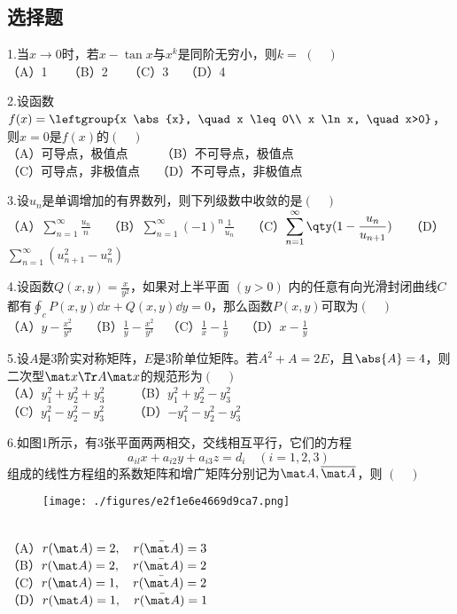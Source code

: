 
\subsection{选择题}
1.当$x \to 0$时，若$x-\tan x$与$x^k$是同阶无穷小，则$k=$ $(\quad)$\\
（A）1 $\quad$ （B）2 $\quad$ （C）3  $\quad$（D）4 $\quad$

2.设函数$f(x)=\leftgroup{x \abs{x}, \quad x \leq 0\\ x \ln x, \quad x>0}$，则$x=0$是$f(x)$的$(\quad)$\\
（A）可导点，极值点 $ \qquad$ （B）不可导点，极值点 \\
（C）可导点，非极值点  $\quad$（D）不可导点，非极值点 

3.设${u_n}$是单调增加的有界数列，则下列级数中收敛的是$(\quad)$\\
（A）$\displaystyle \sum_{n=1}^\infty \frac{u_n}{n} \quad$ 
（B）$\displaystyle \sum_{n=1}^\infty (-1)^n \frac{1}{u_n} \quad$
（C）$\displaystyle \sum_{n=1}^\infty \qty (1- \frac{u_n}{u_{n+1}}) \quad$ 
（D）$\displaystyle \sum_{n=1}^\infty (u_{n+1}^2-u_n ^2)$

4.设函数$Q(x,y)=\frac{x}{y^2}$，如果对上半平面 $(y>0)$ 内的任意有向光滑封闭曲线$C$都有$\oint_c P(x,y)\dd{x}+Q(x,y)\dd{y}=0$，那么函数$P(x,y)$可取为$(\quad)$\\
（A）$ \displaystyle y-\frac{x^2}{y^3} \quad$ （B）$\displaystyle \frac{1}{y}-\frac{x^2}{y^3}\quad$（C）$ \displaystyle \frac{1}{x}-\frac{1}{y}\quad$ （D）$ \displaystyle x-\frac{1}{y}\quad$

5.设$A$是3阶实对称矩阵，$E$是3阶单位矩阵。若$A^2 + A=2E$，且$\abs{A}=4$，则二次型$\mat x\Tr A \mat x$的规范形为$(\quad)$\\
（A）$y_1 ^2+y_2 ^2 +y_3 ^2 \qquad$  （B）$y_1 ^2+y_2 ^2 -y_3 ^2$ \\ 
（C）$y_1 ^2-y_2 ^2 -y_3 ^2 \qquad$  （D）$-y_1 ^2-y_2 ^2 -y_3 ^2$


6.如图1所示，有3张平面两两相交，交线相互平行，它们的方程$$a_{il}x + a_{i2}y + a_{i3}z = d_i \quad (i=1,2,3)~$$组成的线性方程组的系数矩阵和增广矩阵分别记为$\mat A , \overline{ \mat A} $，则 $(\quad)$
\begin{figure}[ht]
\centering
\texttt{[image: ./figures/e2f1e6e4669d9ca7.png]}
\caption{} \label{fig_PeeM19_1}
\end{figure}\\
（A）$r(\mat A)=2,\quad r(\bar{\mat A})=3 \qquad$ \\
（B）$r(\mat A)=2,\quad r(\bar{\mat A})=2 \qquad$\\
（C）$r(\mat A)=1,\quad r(\bar{\mat A})=2 \qquad$ \\
（D）$r(\mat A)=1,\quad r(\bar{\mat A})=1 \qquad$ 

